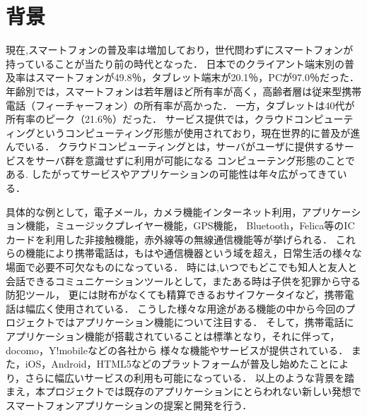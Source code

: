 \section{背景}
\par 
現在,スマートフォンの普及率は増加しており，世代問わずにスマートフォンが持っていることが当たり前の時代となった．
日本でのクライアント端末別の普及率はスマートフォンが49.8％，タブレット端末が20.1％，PCが97.0％だった．
年齢別では，スマートフォンは若年層ほど所有率が高く，高齢者層は従来型携帯電話（フィーチャーフォン）の所有率が高かった．
一方，タブレットは40代が所有率のピーク（21.6％）だった．
サービス提供では，クラウドコンピューティングというコンピューティング形態が使用されており，現在世界的に普及が進んでいる．
クラウドコンピューティングとは，サーバがユーザに提供するサービスをサーバ群を意識せずに利用が可能になる
コンピューテング形態のことである.
したがってサービスやアプリケーションの可能性は年々広がってきている．
\par
具体的な例として，電子メール，カメラ機能インターネット利用，アプリケーション機能，ミュージックプレイヤー機能，GPS機能，
Bluetooth，Felica等のICカードを利用した非接触機能，赤外線等の無線通信機能等が挙げられる．
これらの機能により携帯電話は，もはや通信機器という域を超え，日常生活の様々な場面で必要不可欠なものになっている．
時には,いつでもどこでも知人と友人と会話できるコミュニケーションツールとして，またある時は子供を犯罪から守る防犯ツール，
更には財布がなくても精算できるおサイフケータイなど，携帯電話は幅広く使用されている．
こうした様々な用途がある機能の中から今回のプロジェクトではアプリケーション機能について注目する．
そして，携帯電話にアプリケーション機能が搭載されていることは標準となり，それに伴って，docomo，Y!mobileなどの各社から
様々な機能やサービスが提供されている．
また，iOS，Android，HTML5などのプラットフォームが普及し始めたことにより，さらに幅広いサービスの利用も可能になっている．
以上のような背景を踏まえ，本プロジェクトでは既存のアプリケーションにとらわれない新しい発想で
スマートフォンアプリケーションの提案と開発を行う．
